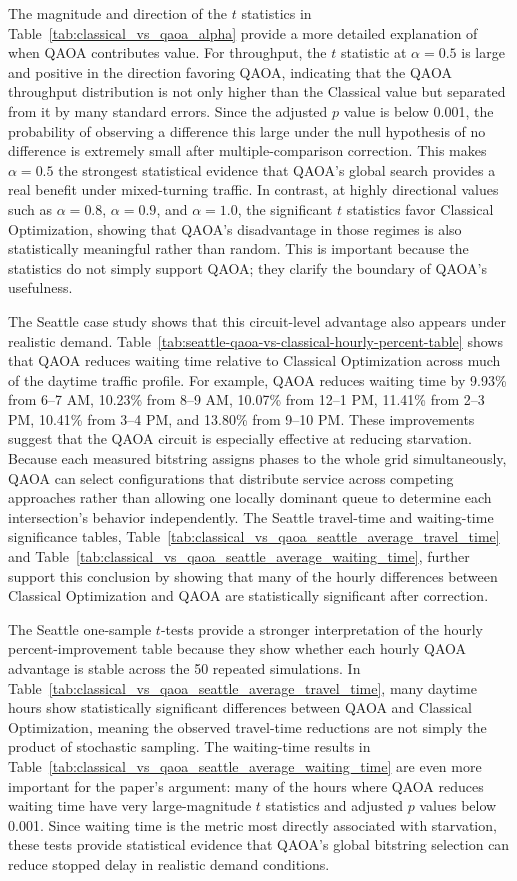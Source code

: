 \documentclass[12pt]{article}
\begin{document}
The magnitude and direction of the $t$ statistics in Table~\ref{tab:classical_vs_qaoa_alpha} provide a more detailed explanation of when QAOA contributes value. For throughput, the $t$ statistic at $\alpha=0.5$ is large and positive in the direction favoring QAOA, indicating that the QAOA throughput distribution is not only higher than the Classical value but separated from it by many standard errors. Since the adjusted $p$ value is below 0.001, the probability of observing a difference this large under the null hypothesis of no difference is extremely small after multiple-comparison correction. This makes $\alpha=0.5$ the strongest statistical evidence that QAOA's global search provides a real benefit under mixed-turning traffic. In contrast, at highly directional values such as $\alpha=0.8$, $\alpha=0.9$, and $\alpha=1.0$, the significant $t$ statistics favor Classical Optimization, showing that QAOA's disadvantage in those regimes is also statistically meaningful rather than random. This is important because the statistics do not simply support QAOA; they clarify the boundary of QAOA's usefulness.

The Seattle case study shows that this circuit-level advantage also appears under realistic demand. Table~\ref{tab:seattle-qaoa-vs-classical-hourly-percent-table} shows that QAOA reduces waiting time relative to Classical Optimization across much of the daytime traffic profile. For example, QAOA reduces waiting time by 9.93\% from 6--7 AM, 10.23\% from 8--9 AM, 10.07\% from 12--1 PM, 11.41\% from 2--3 PM, 10.41\% from 3--4 PM, and 13.80\% from 9--10 PM. These improvements suggest that the QAOA circuit is especially effective at reducing starvation. Because each measured bitstring assigns phases to the whole grid simultaneously, QAOA can select configurations that distribute service across competing approaches rather than allowing one locally dominant queue to determine each intersection's behavior independently. The Seattle travel-time and waiting-time significance tables, Table~\ref{tab:classical_vs_qaoa_seattle_average_travel_time} and Table~\ref{tab:classical_vs_qaoa_seattle_average_waiting_time}, further support this conclusion by showing that many of the hourly differences between Classical Optimization and QAOA are statistically significant after correction.

The Seattle one-sample $t$-tests provide a stronger interpretation of the hourly percent-improvement table because they show whether each hourly QAOA advantage is stable across the 50 repeated simulations. In Table~\ref{tab:classical_vs_qaoa_seattle_average_travel_time}, many daytime hours show statistically significant differences between QAOA and Classical Optimization, meaning the observed travel-time reductions are not simply the product of stochastic sampling. The waiting-time results in Table~\ref{tab:classical_vs_qaoa_seattle_average_waiting_time} are even more important for the paper's argument: many of the hours where QAOA reduces waiting time have very large-magnitude $t$ statistics and adjusted $p$ values below 0.001. Since waiting time is the metric most directly associated with starvation, these tests provide statistical evidence that QAOA's global bitstring selection can reduce stopped delay in realistic demand conditions.
\end{document}

